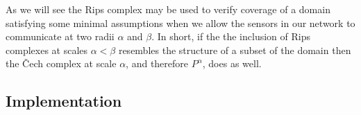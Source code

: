 
As we will see the Rips complex may be used to verify coverage of a domain satisfying some minimal assumptions when we allow the sensors in our network to communicate at two radii $\alpha$ and $\beta$.
In short, if the the inclusion of Rips complexes at scales $\alpha < \beta$ resembles the structure of a subset of the domain then the \v Cech complex at scale $\alpha$, and therefore $P^\alpha$, does as well.

\subsection{Implementation}

